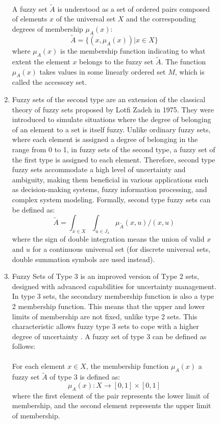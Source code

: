 \documentclass{article}
\begin{document}
\begin{figure}[!t]
\begin{minipage}{0.49\textwidth}
\begin{enumerate}
                ~\\
                A fuzzy set $\tilde{A}$ is understood as a set of ordered pairs composed of elements $x$ of the universal set $X$ and the corresponding degrees of membership $\mu_A(x)$:\\
                $$\tilde{A}=\{(x, \mu_A(x)) | x \in X\}$$
                where $\mu_A(x)$ is the membership function indicating to what extent the element $x$ belongs to the fuzzy set $\tilde{A}$. The function $\mu_A(x)$ takes values in some linearly ordered set $M$, which is called the accessory set.
                \item Fuzzy sets of the second type are an extension of the classical theory of fuzzy sets proposed by Lotfi Zadeh in 1975. They were introduced to simulate situations where the degree of belonging of an element to a set is itself fuzzy. Unlike ordinary fuzzy sets, where each element is assigned a degree of belonging in the range from 0 to 1, in fuzzy sets of the second type, a fuzzy set of the first type is assigned to each element. Therefore, second type fuzzy sets accommodate a high level of uncertainty and ambiguity, making them beneficial in various applications such as decision-making systems, fuzzy information processing, and complex system modeling. Formally, second type fuzzy sets can be defined as:
                $$\tilde{A}=\int_{x\in X}\int_{u\in J_{x}} \mu_{\tilde{A}}(x,u) / (x,u)$$
                where the sign of double integration means the union of valid $x$ and $u$ for a continuous universal set (for discrete universal sets, double summation symbols are used instead).
                \item Fuzzy Sets of Type 3 is an improved version of Type 2 sets, designed with advanced capabilities for uncertainty management. In type 3 sets, the secondary membership function is also a type 2 membership function. This means that the upper and lower limits of membership are not fixed, unlike type 2 sets. This characteristic allows fuzzy type 3 sets to cope with a higher degree of uncertainty \cite{litlink22}. A fuzzy set of type 3 can be defined as follows:\\
                ~\\
                For each element \(x \in X\), the membership function \(\mu_{A}(x)\) a fuzzy set \(\tilde{A}\) of type 3 is defined as:\\
                \[\mu_{A}(x) : X \rightarrow [0,1] \times [0,1]\]
                where the first element of the pair represents the lower limit of membership, and the second element represents the upper limit of membership.\\

\end{enumerate}
\end{minipage}
\end{figure}
\end{document}
